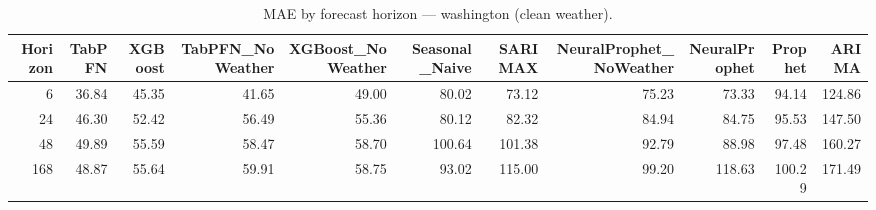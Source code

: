 \begin{table}[ht!]
\centering
\caption{MAE by forecast horizon — washington (clean weather).}
\label{tab:mae_by_horizon_washington}
\begin{tabular}{rrrrrrrrrrr}
\toprule
Horizon & TabPFN & XGBoost & TabPFN\_NoWeather & XGBoost\_NoWeather & Seasonal\_Naive & SARIMAX & NeuralProphet\_NoWeather & NeuralProphet & Prophet & ARIMA \\
\midrule
6 & 36.84 & 45.35 & 41.65 & 49.00 & 80.02 & 73.12 & 75.23 & 73.33 & 94.14 & 124.86 \\
24 & 46.30 & 52.42 & 56.49 & 55.36 & 80.12 & 82.32 & 84.94 & 84.75 & 95.53 & 147.50 \\
48 & 49.89 & 55.59 & 58.47 & 58.70 & 100.64 & 101.38 & 92.79 & 88.98 & 97.48 & 160.27 \\
168 & 48.87 & 55.64 & 59.91 & 58.75 & 93.02 & 115.00 & 99.20 & 118.63 & 100.29 & 171.49 \\
\bottomrule
\end{tabular}
\end{table}
